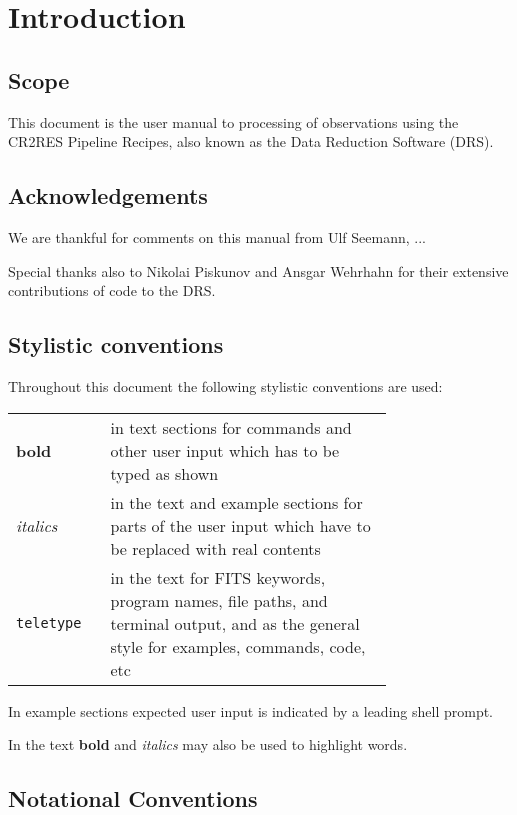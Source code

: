 \section{Introduction}
\label{sec:introduction}

\subsection{Scope}
\label{sec:scope}
This document is the user manual to processing of \instrument{}
observations using the CR2RES
Pipeline Recipes, also known as the \instrument{} Data Reduction Software 
(DRS).


\subsection{Acknowledgements}
We are thankful for comments on this manual from
Ulf Seemann, ...

Special thanks also to Nikolai Piskunov and Ansgar
Wehrhahn for their extensive contributions of code
to the DRS.

\subsection{Stylistic conventions}
\label{sec:style}

Throughout this document the following stylistic conventions are used:

\begin{tabular}{lp{0.75\linewidth}}
\textbf{bold}     & in text sections for commands and other
                    user input which has to be typed as shown \\
\textit{italics}  & in the text and example sections for parts of the user
                    input which have to be replaced with real contents \\
\texttt{teletype} & in the text for FITS keywords, program names, file paths,
                    and terminal output, and as the general style for examples,
                    commands, code, etc \\
\end{tabular}

In example sections expected user input is indicated by a leading shell
prompt.

In the text \textbf{bold} and \textit{italics} may also be used to highlight
words.

\subsection{Notational Conventions}
\label{sec:notation}

